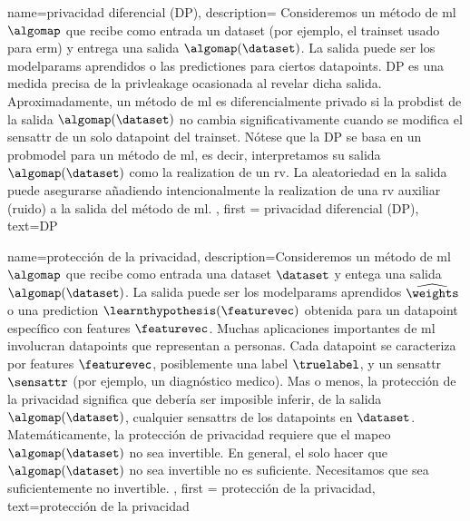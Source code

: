 {{
{name=privacidad diferencial (DP),
  description={
  	Consideremos un método de \gls{ml} $\algomap$ que recibe como entrada un \gls{dataset} (por ejemplo, el \gls{trainset} 
  	usado para \gls{erm}) y entrega una salida $\algomap(\dataset)$. La salida 
  	puede ser los \gls{modelparams} aprendidos o las \gls{prediction}es para ciertos \gls{datapoint}s. 
  	DP es una medida precisa de la \gls{privleakage} ocasionada al revelar dicha salida.
	Aproximadamente, un método de \gls{ml} es diferencialmente privado si la \gls{probdist} 
  	de la salida $\algomap(\dataset)$ no cambia significativamente cuando se modifica el \gls{sensattr} 
  	de un solo \gls{datapoint} del \gls{trainset}. Nótese que la DP 
  	se basa en un \gls{probmodel} para un método de \gls{ml}, es decir, interpretamos su salida $\algomap(\dataset)$ 
  	como la \gls{realization} de un \gls{rv}. La aleatoriedad en la salida puede asegurarse añadiendo intencionalmente la
  	\gls{realization} de una \gls{rv} auxiliar (ruido) a la salida del método de  \gls{ml}.
	}, 
	first = {privacidad diferencial (DP)}, text={DP} 
}

{name=protección de la privacidad,
     description={Consideremos un método de \gls{ml}  $\algomap$ que recibe como entrada 
	 una \gls{dataset} $\dataset$ y entega una salida $\algomap(\dataset)$. La salida 
	 puede ser los \gls{modelparams} aprendidos $\widehat{\weights}$ o una \gls{prediction} 
	 $\learnthypothesis(\featurevec)$ obtenida para un \gls{datapoint} específico con \gls{feature}s 
	 $\featurevec$. Muchas aplicaciones importantes de \gls{ml} involucran \gls{datapoint}s 
		que representan a personas. Cada \gls{datapoint} se caracteriza por \gls{feature}s $\featurevec$, 
		posiblemente una \gls{label} $\truelabel$, y un \gls{sensattr} $\sensattr$ (por ejemplo, un diagnóstico medico). 
		Mas o menos, la protección de la privacidad significa que debería ser imposible inferir, de la salida $\algomap(\dataset)$, 
		cualquier \gls{sensattr}s de los \gls{datapoint}s en $\dataset$. Matemáticamente, la protección de privacidad requiere que  
		el mapeo $\algomap(\dataset)$ no sea invertible. En general, el solo hacer que  $\algomap(\dataset)$ no sea invertible 
		no es suficiente. Necesitamos que sea suficientemente no invertible. 
	}, 
	first = {protección de la privacidad}, text={protección de la privacidad} 
}

}}
